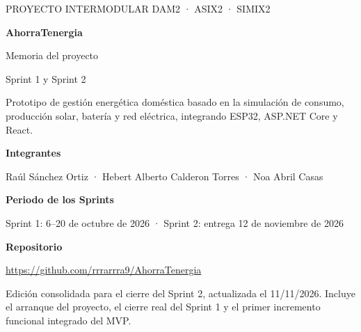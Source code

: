 \documentclass[11pt,a4paper,oneside]{report}
\begin{document}

\begin{titlepage}
\thispagestyle{empty}

\vspace*{2.0cm}

{\sffamily\color{forest}\Large PROYECTO INTERMODULAR \quad DAM2 · ASIX2 · SIMIX2\par}

\vspace{1.1cm}

{\sffamily\bfseries\fontsize{39}{44}\selectfont AhorraTenergia\par}

\vspace{0.4cm}

{\sffamily\color{muted}\LARGE Memoria del proyecto\par}

\vspace{0.13cm}

{\sffamily\Large Sprint 1 y Sprint 2\par}

\vspace{0.9cm}


\vspace{0.8cm}

{\large
Prototipo de gestión energética doméstica basado en la simulación de consumo,
producción solar, batería y red eléctrica, integrando ESP32, ASP.NET Core y React.
\par}

\vfill

{\sffamily\bfseries Integrantes\par}
Raúl Sánchez Ortiz · Hebert Alberto Calderon Torres · Noa Abril Casas\par

\vspace{0.3cm}

{\sffamily\bfseries Periodo de los Sprints\par}
Sprint 1: 6--20 de octubre de 2026 · Sprint 2: entrega 12 de noviembre de 2026\par

\vspace{0.3cm}

{\sffamily\bfseries Repositorio\par}
\url{https://github.com/rrrarrra9/AhorraTenergia}\par

\vspace{0.55cm}

{\small\color{muted}
Edición consolidada para el cierre del Sprint 2, actualizada el 11/11/2026. Incluye el arranque del proyecto,
el cierre real del Sprint 1 y el primer incremento funcional integrado del MVP.
\par}

\end{titlepage}
\end{document}
